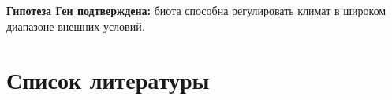 \documentclass[
  10pt,
  presentation]{beamer}
\newlength{\cslhangindent}
\newenvironment{CSLReferences}[2] %
 {\begin{list}{}{%
  \setlength{\itemindent}{0pt}
  \setlength{\leftmargin}{0pt}
  \setlength{\parsep}{0pt}
  \ifodd #1
   \setlength{\leftmargin}{\cslhangindent}
   \setlength{\itemindent}{-1\cslhangindent}
  \fi
  \setlength{\itemsep}{#2\baselineskip}}}
 {\end{list}}
\begin{document}
\textbf{Гипотеза Геи подтверждена:} биота способна регулировать климат в
широком диапазоне внешних условий.

\section{Список
литературы}\label{ux441ux43fux438ux441ux43eux43a-ux43bux438ux442ux435ux440ux430ux442ux443ux440ux44b}

\label{refs}
\begin{CSLReferences}{0}{1}
\end{CSLReferences}
\end{document}
